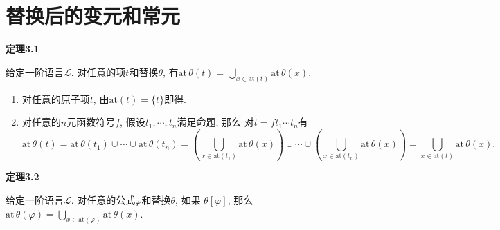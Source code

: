 \documentclass[UTF8]{ctexart}
\begin{document}
\newpage

\section{替换后的变元和常元}

\hypertarget{sec:定理3.1}{}
\noindent\textbf{定理3.1}

给定一阶语言$\mathcal{L}$. 对任意的项$t$和替换$\theta$, 有$\displaystyle
\mathrm{at}\,\theta(t)=\bigcup_{x\in\mathrm{at}(t)}\mathrm{at}\,\theta(x)$.


\begin{enumerate}
    \item 对任意的原子项$t$, 由$\mathrm{at}(t)=\{t\}$即得.
    \item 对任意的$n$元函数符号$f$, 假设$t_1,\cdots,t_n$满足命题, 那么
    对$t=ft_1\cdots t_n$有
    \vspace{3pt}
    \begin{equation*}
        \mathrm{at}\,\theta(t)=
        \mathrm{at}\,\theta(t_1)\cup\cdots\cup\mathrm{at}\,\theta(t_n)=
        \left(\bigcup_{x\in\mathrm{at}(t_1)}\mathrm{at}\,\theta(x)\right)\cup\cdots
        \cup\left(\bigcup_{x\in\mathrm{at}(t_n)}\mathrm{at}\,\theta(x)\right)=
        \bigcup_{x\in\mathrm{at}(t)}\mathrm{at}\,\theta(x).
    \tag*{\qedsymbol}\end{equation*}
\end{enumerate}

\vspace{10pt}

\hypertarget{sec:定理3.2}{}
\noindent\textbf{定理3.2}

给定一阶语言$\mathcal{L}$. 对任意的公式$\varphi$和替换$\theta$, 如果
$\theta[\varphi]$, 那么$\displaystyle\mathrm{at}\,\theta(\varphi)=
\bigcup_{x\in\mathrm{at}(\varphi)}\mathrm{at}\,\theta(x)$.

\end{document}

